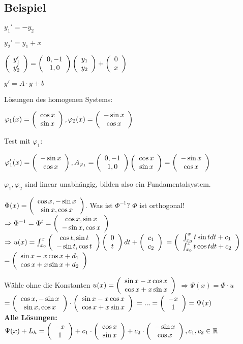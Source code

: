 \renewcommand{\ldate}{2015-12-17}

\subsection{Beispiel}
$y_1' = -y_2$

$y_2' = y_1 + x$

$\vektor{y_1'\\y_2'} = \vektor{0, -1\\1,0} \vektor{y_1\\y_2} + \vektor{0\\x}$

$y' = A\cdot y + b$

Lösungen des homogenen Systems: 

$ \varphi_1(x) = \vektor{\cos x \\ \sin x}, \varphi_2(x)=\vektor{-\sin x\\\cos x}$

Test mit $\varphi_1$:

$\varphi_1'(x) = \vektor{-\sin x\\\cos x}, A_{\varphi_1} = \vektor{0,-1\\1,0} \vektor{\cos x\\\sin x} = \vektor{-\sin x\\\cos x}$

$\varphi_1, \varphi_2$ sind linear unabhängig, bilden also ein Fundamentalsystem.

$\Phi(x) = \vektor{\cos x, -\sin x\\\sin x, \cos x}$. Was ist $\Phi^{-1}$? $\Phi$ ist orthogonal! 
$\Rightarrow \Phi^{-1} = \Phi^t = \vektor{\cos x, \sin x\\-\sin x, \cos x}$
$\Rightarrow u(x) = \int_{x_0}^{x} \vektor{\cos t, \sin t\\-\sin t, \cos t} \vektor{0\\t} dt + \vektor{c_1\\c_2}$
$=\vektor{\int_{x_0}^{x} t \sin t dt + c_1\\\int_{x_0}^{x} t \cos t dt + c_2}$
$=\vektor{\sin x - x \cos x + d_1\\\cos x + x \sin x + d_2}$ 

Wähle ohne die Konstanten $u(x) = \vektor{\sin x - x \cos x\\\cos x + x \sin x}$
$\Rightarrow \Psi(x) = \Phi \cdot u$
$=\vektor{\cos x, -\sin x\\\sin x, \cos x} \cdot \vektor{\sin x - x \cos x\\\cos x + x \sin x}$
$=...=\vektor{-x\\1} = \Psi(x)$\\

\textbf{Alle Lösungen:}\\
$\Psi(x) + L_h = \vektor{-x\\1} + c_1 \cdot \vektor{\cos x \\ \sin x} + c_2 \cdot \vektor{-\sin x\\\cos x}, c_1,c_2 \in \R$